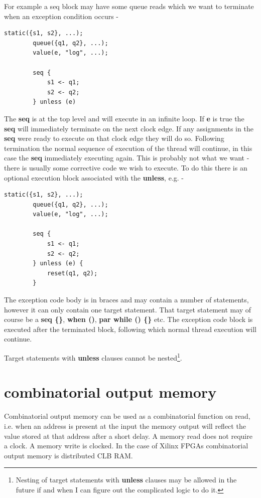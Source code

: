 \documentclass[10pt,a4paper,twoside,fleqn]{article}
\newcommand{\var}[1]{{\bf #1}} %
\begin{document}
    For example a seq block may have some queue reads which we want to terminate
    when an exception condition occurs -
    \begin{lstlisting}[language=threepl]
        static({s1, s2}, ...);
        queue({q1, q2}, ...);
        value(e, "log", ...);

        seq {
            s1 <- q1;
            s2 <- q2;
        } unless (e)
    \end{lstlisting}
    The {\bf seq} is at the top level and will execute in an infinite loop. If
    \var{e} is true the {\bf seq} will immediately terminate on the next clock
    edge. If any assignments in the {\bf seq} were ready to execute on that clock
    edge they will do so. Following termination the normal sequence of execution of
    the thread will continue, in this case the {\bf seq} immediately executing
    again. This is probably not what we want - there is usually some corrective
    code we wish to execute. To do this  there is an optional execution block
    associated with the {\bf unless}, e.g. -
    \begin{lstlisting}[language=threepl]
        static({s1, s2}, ...);
        queue({q1, q2}, ...);
        value(e, "log", ...);

        seq {
            s1 <- q1;
            s2 <- q2;
        } unless (e) {
            reset(q1, q2);
        }
    \end{lstlisting}
    The exception code body is in braces and may contain a number of statements,
    however it can only contain one target statement. That target statement
    may of course be a {\bf seq \{\}}, {\bf when ()},  {\bf par while () \{\}} etc.
    The exception code block is executed after the terminated block, following
    which normal thread execution will continue.
    
    Target statements with {\bf unless} clauses cannot be nested\footnote{Nesting
    of target statements with {\bf unless} clauses may be allowed in the future
    if and when I can figure out the complicated logic to do it.}.


\section{combinatorial output memory}

    Combinatorial output memory can be used as a combinatorial function on read,
    i.e. when an address is present at the input the memory output will reflect
    the value stored at that address after a short delay. A memory read does not
    require a clock. A memory write is clocked. In the case of Xilinx FPGAs
    combinatorial output memory is distributed CLB RAM.
    
\end{document}
